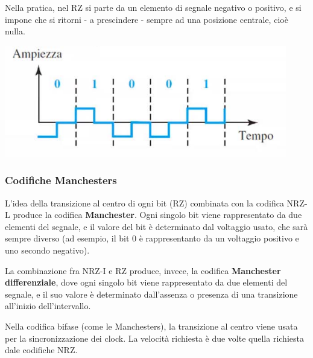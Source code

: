             Nella pratica, nel RZ si parte da un elemento di segnale negativo o positivo, e si impone che si ritorni - a prescindere - sempre ad una posizione centrale, cioè nulla.
            
            \begin{center}
                \includegraphics[scale=0.5]{images/RZ.png}
            \end{center}
        
        \subsubsection{Codifiche Manchesters}
        
            L'idea della transizione al centro di ogni bit (RZ) combinata con la codifica NRZ-L produce la codifica \textbf{Manchester}. Ogni singolo bit viene rappresentato da due elementi del segnale, e il valore del bit è determinato dal voltaggio usato, che sarà sempre diverso (ad esempio, il bit 0 è rappresentanto da un voltaggio positivo e uno secondo negativo). 
            
            La combinazione fra NRZ-I e RZ produce, invece, la codifica \textbf{Manchester differenziale}, dove ogni singolo bit viene rappresentato da due elementi del segnale, e il suo valore è determinato dall'assenza o presenza di una transizione all'inizio dell'intervallo.
            
            Nella codifica bifase (come le Manchesters), la transizione al centro viene usata per la sincronizzazione dei clock. La velocità richiesta è due volte quella richiesta dale codifiche NRZ.
            
